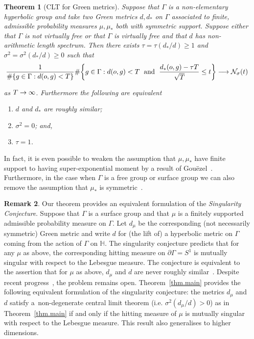 \documentclass[10pt]{amsart}
\newtheorem{theo}{Theorem}[section]
\theoremstyle{definition}\newtheorem{defi}[theo]{Definition}\newtheorem{rema}[theo]{Remark}\newtheorem{exam}[theo]{Example}\newtheorem{exem}[theo]{Example}\newtheorem{nota}[theo]{Notation}
\newcommand{\G}{\Gamma}
\newcommand{\Nc}{\mathcal{N}}
\renewcommand{\H}{\mathbb{H}}
\let\originalleft\left
\let\originalright\right
\renewcommand{\left}{\mathopen{}\mathclose\bgroup\originalleft}
\renewcommand{\right}{\aftergroup\egroup\originalright}
\renewcommand*{\to}{\mathchoice{\longrightarrow}{\rightarrow}{\rightarrow}{\rightarrow}}
\newcounter{setofcase}
\newcounter{case}[setofcase]
\theoremstyle{plain}
\begin{document}
\begin{theo}[CLT for Green metrics]
Suppose that $\G$ is a non-elementary hyperbolic group and take two Green metrics $d, d_\ast$ on $\G$ associated to finite, admissible probability measures $\mu, \mu_\ast$ both with symmetric support. Suppose either that $\G$ is not virtually free or that $\G$ is virtually free and that $d$ has non-arithmetic length spectrum. Then there exists $\tau = \tau(d_\ast/d) \ge 1$ and $\sigma^2 = \sigma^2(d_\ast/d) \ge 0$ such that
\begin{align*}
\frac{1}{\#\left\{ g \in \G: d(o,g) < T\right\}}
\#\left\{ g \in \G: d(o,g) < T\; \text{ and } \; \frac{d_\ast(o,g) - \tau T}{\sqrt{T}} \le t \right\} \to \Nc_\sigma(t)
\end{align*}
\pagebreak{}

\noindent as $T\to\infty$. Furthermore the following are equivalent
\begin{enumerate}
\item\label{theo1.4.1} $d$ and $d_\ast$ are roughly similar;
\item\label{theo1.4.2} $\sigma^2 = 0$; and,
\item\label{theo1.4.3} $\tau = 1$.
\end{enumerate}
\end{theo}

In fact, it is even possible to weaken the assumption that $\mu, \mu_\ast$ have finite support to having super-exponential moment by a result of Gou\"ezel~\cite{GouezelAncona}. Furthermore, in the case when $\G$ is a free group or surface group we can also remove the assumption that $\mu_\ast$ is symmetric~\cite{GouezelLocalLimit}.



\begin{rema}
Our theorem provides an equivalent formulation of the \emph{Singularity Conjecture}. Suppose that $\G$ is a surface group and that $\mu$ is a finitely supported admissible probability measure on $\G$. Let $d_\mu$ be the corresponding (not necessarily symmetric) Green metric and write $d$ for (the lift of) a hyperbolic metric on $\G$ coming from the action of $\G$ on $\H$. The {singularity conjecture} predicts that for any $\mu$ as above, the corresponding hitting measure on $\partial \G = S^1$ is mutually singular with respect to the Lebesgue measure. The conjecture is equivalent to the assertion that for $\mu$ as above, $d_\mu$ and $d$ are never roughly similar~\cite{GMM2018}. Despite recent progress~\cite{lessa.1,lessa.2,kosenko,kosenko.tiozzo}, the problem remains open. Theorem~\ref{thm.main} provides the following equivalent formulation of the singularity conjecture: the metrics $d_\mu$ and $d$ satisfy a~non-degenerate central limit theorem (i.e. $\sigma^2(d_\mu/d) > 0$) as in Theorem~\ref{thm.main} if and only if the hitting measure of $\mu$ is mutually singular with respect to the Lebesgue measure. This result also generalises to higher dimensions.
\end{rema}
\end{document}
